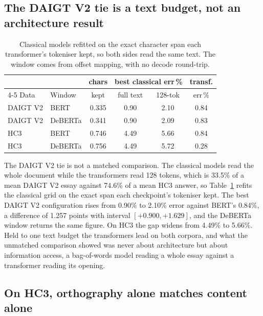 \subsection{The DAIGT V2 tie is a text budget, not an architecture result}
\label{sec:budget}

\begin{table}[!ht]
\centering
\caption{Classical models refitted on the exact character span each transformer's tokeniser kept, so both sides read the same text. The window comes from offset mapping, with no decode round-trip.}
\label{tab:budget}
\footnotesize
\setlength{\tabcolsep}{3.5pt}
\begin{tabular}{@{}llcccc@{}}
\toprule
& & chars & \multicolumn{2}{c}{best classical err\,\%} & transf. \\
\cmidrule(lr){4-5}
Data & Window & kept & full text & 128-tok & err\,\% \\
\midrule
DAIGT V2 & BERT & 0.335 & 0.90 & 2.10 & 0.84 \\
DAIGT V2 & DeBERTa & 0.341 & 0.90 & 2.09 & 0.83 \\
HC3 & BERT & 0.746 & 4.49 & 5.66 & 0.84 \\
HC3 & DeBERTa & 0.756 & 4.49 & 5.72 & 0.28 \\
\bottomrule
\end{tabular}
\end{table}

The DAIGT V2 tie is not a matched comparison. The classical models read the whole document while the transformers read 128 tokens, which is 33.5\% of a mean DAIGT V2 essay against 74.6\% of a mean HC3 answer, so Table~\ref{tab:budget} refits the classical grid on the exact span each checkpoint's tokeniser kept. The best DAIGT V2 configuration rises from 0.90\% to 2.10\% error against BERT's 0.84\%, a difference of 1.257 points with interval $[+0.900, +1.629]$, and the DeBERTa window returns the same figure. On HC3 the gap widens from 4.49\% to 5.66\%. Held to one text budget the transformers lead on both corpora, and what the unmatched comparison showed was never about architecture but about information access, a bag-of-words model reading a whole essay against a transformer reading its opening.

\subsection{On HC3, orthography alone matches content alone}
\label{sec:decomp}

